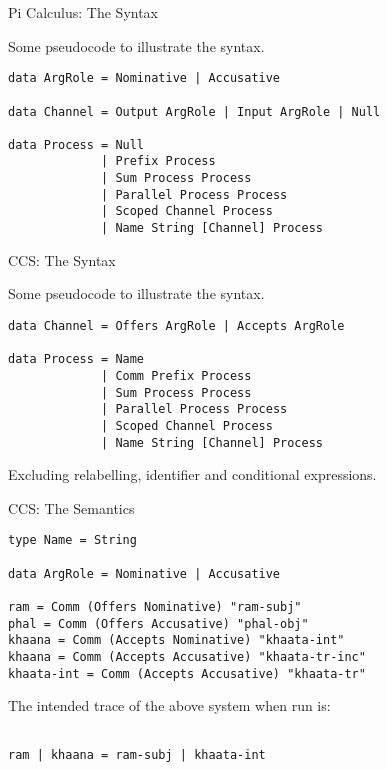 \documentclass{beamer}
\begin{document}
\begin{frame}{Pi Calculus: The Syntax}

Some pseudocode to illustrate the syntax.

\begin{verbatim}
data ArgRole = Nominative | Accusative

data Channel = Output ArgRole | Input ArgRole | Null

data Process = Null 
			 | Prefix Process
			 | Sum Process Process
			 | Parallel Process Process
			 | Scoped Channel Process
			 | Name String [Channel] Process  
\end{verbatim}

\end{frame}


\begin{frame}{CCS: The Syntax}

Some pseudocode to illustrate the syntax.

\begin{verbatim}
data Channel = Offers ArgRole | Accepts ArgRole  
               
data Process = Name 
			 | Comm Prefix Process
			 | Sum Process Process
			 | Parallel Process Process
			 | Scoped Channel Process
			 | Name String [Channel] Process  
\end{verbatim}

Excluding relabelling, identifier and conditional expressions.

\end{frame}


\begin{frame}{CCS: The Semantics}

\begin{verbatim}
type Name = String

data ArgRole = Nominative | Accusative
			 
ram = Comm (Offers Nominative) "ram-subj"
phal = Comm (Offers Accusative) "phal-obj"
khaana = Comm (Accepts Nominative) "khaata-int"
khaana = Comm (Accepts Accusative) "khaata-tr-inc"
khaata-int = Comm (Accepts Accusative) "khaata-tr"
\end{verbatim}

The intended trace of the above system when run is:

\begin{verbatim}

ram | khaana = ram-subj | khaata-int

\end{verbatim}

\end{frame}
\end{document}
